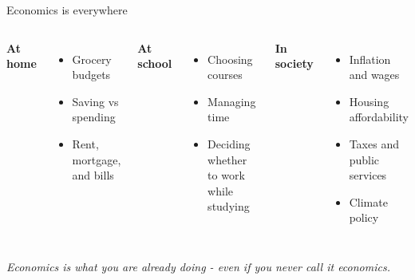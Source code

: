 \documentclass[aspectratio=169,11pt]{beamer}
\begin{document}
\begin{frame}{Economics is everywhere}
\begin{columns}[T,totalwidth=\textwidth]
\textbf{At home}
\begin{itemize}
    \item Grocery budgets
    \item Saving vs spending
    \item Rent, mortgage, and bills
\end{itemize}
\vspace{0.2cm}
\textbf{At school}
\begin{itemize}
    \item Choosing courses
    \item Managing time
    \item Deciding whether to work while studying
\end{itemize}

\textbf{In society}
\begin{itemize}
    \item Inflation and wages
    \item Housing affordability
    \item Taxes and public services
    \item Climate policy
\end{itemize}
\end{columns}
\vspace{0.4cm}
\textit{Economics is what you are already doing - even if you never call it economics.}
\end{frame}
\end{document}
